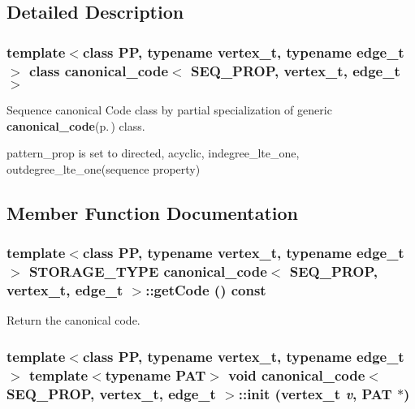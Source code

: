 \subsection{Detailed Description}
\subsubsection*{template$<$class PP, typename vertex\_\-t, typename edge\_\-t$>$ class canonical\_\-code$<$ SEQ\_\-PROP, vertex\_\-t, edge\_\-t $>$}

Sequence canonical Code class by partial specialization of generic {\bf canonical\_\-code}{\rm (p.\,\pageref{classcanonical__code})} class. 

pattern\_\-prop is set to directed, acyclic, indegree\_\-lte\_\-one, outdegree\_\-lte\_\-one(sequence property) 



\subsection{Member Function Documentation}
\subsubsection{\setlength{\rightskip}{0pt plus 5cm}template$<$class PP, typename vertex\_\-t, typename edge\_\-t$>$ STORAGE\_\-TYPE {\bf canonical\_\-code}$<$ SEQ\_\-PROP, vertex\_\-t, edge\_\-t $>$::get\-Code () const\hspace{0.3cm}{\tt  [inline]}}\label{classcanonical__code_3_01SEQ__PROP_00_01vertex__t_00_01edge__t_01_4_a4}


Return the canonical code. 
\subsubsection{\setlength{\rightskip}{0pt plus 5cm}template$<$class PP, typename vertex\_\-t, typename edge\_\-t$>$ template$<$typename PAT$>$ void {\bf canonical\_\-code}$<$ SEQ\_\-PROP, vertex\_\-t, edge\_\-t $>$::init (vertex\_\-t {\em v}, PAT $\ast$)\hspace{0.3cm}{\tt  [inline]}}\label{classcanonical__code_3_01SEQ__PROP_00_01vertex__t_00_01edge__t_01_4_a1}


